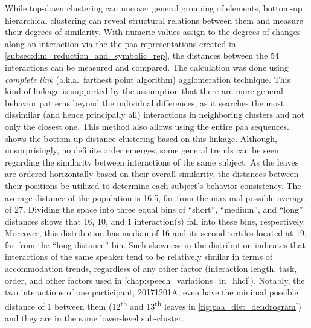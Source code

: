 While top-down clustering can uncover general grouping of elements, bottom-up hierarchical clustering can reveal structural relations between them and measure their degrees of similarity.
With numeric values assign to the degrees of changes along an interaction via the the \ac{paa} representations created in \cref{subsec:dim_reduction_and_symbolic_rep}, the distances between the 54 interactions can be measured and compared.
The calculation was done using \emph{complete link} (a.k.a.\ farthest point algorithm) agglomeration technique.
This kind of linkage is supported by the assumption that there are more general behavior patterns beyond the individual differences, as it searches the most dissimilar (and hence principally all) interactions in neighboring clusters and not only the closest one.
This method also allows using the entire \ac{paa} sequences.
 shows the bottom-up distance clustering based on this linkage. 
Although, unsurprisingly, no definite order emerges, some general trends can be seen regarding the similarity between interactions of the same subject.
As the leaves are ordered horizontally based on their overall similarity, the distances between their positions be utilized to determine each subject's behavior consistency.
The average distance of the population is 16.5, far from the maximal possible average of 27.
Dividing the space into three equal bins of \enquote{short}, \enquote{medium}, and \enquote{long} distances shows that 16, 10, and 1 interaction(s) fall into these bins, respectively.
Moreover, this distribution has median of 16 and its second tertiles located at 19, far from the \enquote{long distance} bin.
Such skewness in the distribution indicates that interactions of the same speaker tend to be relatively similar in terms of accommodation trends, regardless of any other factor (interaction length, task, order, and other factors used in \cref{chap:speech_variations_in_hhci}).
Notably, the two interactions of one participant, 20171201A, even have the minimal possible distance of 1 between them (12\textsuperscript{th} and 13\textsuperscript{th} leaves in \cref{fig:paa_dist_dendrogram}) and they are in the same lower-level sub-cluster.

